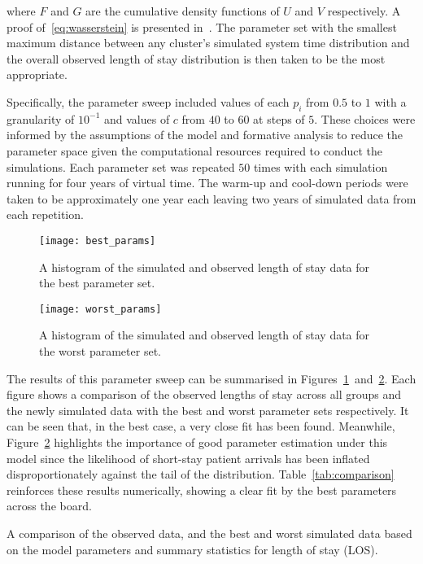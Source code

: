 \noindent where \(F\) and \(G\) are the cumulative density functions of \(U\)
and \(V\) respectively. A proof of~\eqref{eq:wasserstein} is presented
in~\cite{Ramdas2017}. The parameter set with the smallest maximum distance
between any cluster's simulated system time distribution and the overall
observed length of stay distribution is then taken to be the most appropriate.

Specifically, the parameter sweep included values of each \(p_i\) from \(0.5\)
to \(1\) with a granularity of \(10^{-1}\) and values of \(c\) from \(40\) to
\(60\) at steps of \(5\).  %
These choices were informed by the assumptions of the
model and formative analysis to reduce the parameter space given the
computational resources required to conduct the simulations. Each parameter set
was repeated \(50\) times with each simulation running for four years of virtual
time. The warm-up and cool-down periods were taken to be approximately one year
each leaving two years of simulated data from each repetition.

\begin{figure}
    \centering%
    \texttt{[image: best\_params]}
    \caption{A histogram of the simulated and observed length of stay data for
             the best parameter set.}\label{fig:best_params}
\end{figure}

\begin{figure}
    \centering%
    \texttt{[image: worst\_params]}
    \caption{A histogram of the simulated and observed length of stay data for
             the worst parameter set.}\label{fig:worst_params}
\end{figure}

The results of this parameter sweep can be summarised in
Figures~\ref{fig:best_params}~and~\ref{fig:worst_params}. Each figure shows a
comparison of the observed lengths of stay across all groups and the newly
simulated data with the best and worst parameter sets respectively. It can be
seen that, in the best case, a very close fit has been found. Meanwhile,
Figure~\ref{fig:worst_params} highlights the importance of good parameter
estimation under this model since the likelihood of short-stay patient arrivals
has been inflated disproportionately against the tail of the distribution.
Table~\ref{tab:comparison} reinforces these results numerically, showing a
clear fit by the best parameters across the board.

\begin{table}
    \centering
    \resizebox{\textwidth}{!}{}
    \caption{A comparison of the observed data, and the best and worst simulated
        data based on the model parameters and summary statistics for length of
    stay (LOS).}\label{tab:comparison}
\end{table}

